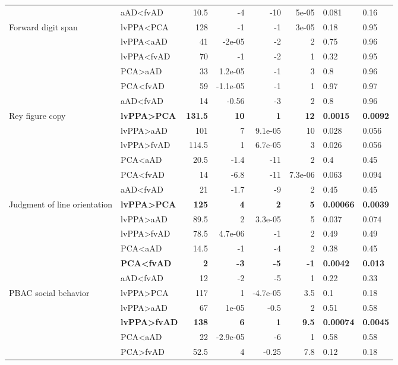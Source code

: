 \documentclass[]{article}
\begin{document}
\begin{table}[ht]
{\begin{tabular}{llrrrrll}
   & aAD<fvAD & 10.5 & -4 & -10 & 5e-05 & 0.081 & 0.16 \\ 
  Forward digit span & lvPPA<PCA & 128 & -1 & -1 & 3e-05 & 0.18 & 0.95 \\ 
   & lvPPA<aAD & 41 & -2e-05 & -2 & 2 & 0.75 & 0.96 \\ 
   & lvPPA<fvAD & 70 & -1 & -2 & 1 & 0.32 & 0.95 \\ 
   & PCA>aAD & 33 & 1.2e-05 & -1 & 3 & 0.8 & 0.96 \\ 
   & PCA<fvAD & 59 & -1.1e-05 & -1 & 1 & 0.97 & 0.97 \\ 
   & aAD<fvAD & 14 & -0.56 & -3 & 2 & 0.8 & 0.96 \\ 
  Rey figure copy & \textbf{lvPPA>PCA} & \textbf{131.5} & \textbf{10} & \textbf{1} & \textbf{12} & \textbf{0.0015} & \textbf{0.0092} \\ 
   & lvPPA>aAD & 101 & 7 & 9.1e-05 & 10 & 0.028 & 0.056 \\ 
   & lvPPA>fvAD & 114.5 & 1 & 6.7e-05 & 3 & 0.026 & 0.056 \\ 
   & PCA<aAD & 20.5 & -1.4 & -11 & 2 & 0.4 & 0.45 \\ 
   & PCA<fvAD & 14 & -6.8 & -11 & 7.3e-06 & 0.063 & 0.094 \\ 
   & aAD<fvAD & 21 & -1.7 & -9 & 2 & 0.45 & 0.45 \\ 
  Judgment of line orientation & \textbf{lvPPA>PCA} & \textbf{125} & \textbf{4} & \textbf{2} & \textbf{5} & \textbf{0.00066} & \textbf{0.0039} \\ 
   & lvPPA>aAD & 89.5 & 2 & 3.3e-05 & 5 & 0.037 & 0.074 \\ 
   & lvPPA>fvAD & 78.5 & 4.7e-06 & -1 & 2 & 0.49 & 0.49 \\ 
   & PCA<aAD & 14.5 & -1 & -4 & 2 & 0.38 & 0.45 \\ 
   & \textbf{PCA<fvAD} & \textbf{2} & \textbf{-3} & \textbf{-5} & \textbf{-1} & \textbf{0.0042} & \textbf{0.013} \\ 
   & aAD<fvAD & 12 & -2 & -5 & 1 & 0.22 & 0.33 \\ 
  PBAC social behavior & lvPPA>PCA & 117 & 1 & -4.7e-05 & 3.5 & 0.1 & 0.18 \\ 
   & lvPPA>aAD & 67 & 1e-05 & -0.5 & 2 & 0.51 & 0.58 \\ 
   & \textbf{lvPPA>fvAD} & \textbf{138} & \textbf{6} & \textbf{1} & \textbf{9.5} & \textbf{0.00074} & \textbf{0.0045} \\ 
   & PCA<aAD & 22 & -2.9e-05 & -6 & 1 & 0.58 & 0.58 \\ 
   & PCA>fvAD & 52.5 & 4 & -0.25 & 7.8 & 0.12 & 0.18 \\ 

\end{tabular}}
\end{table}
\end{document}
